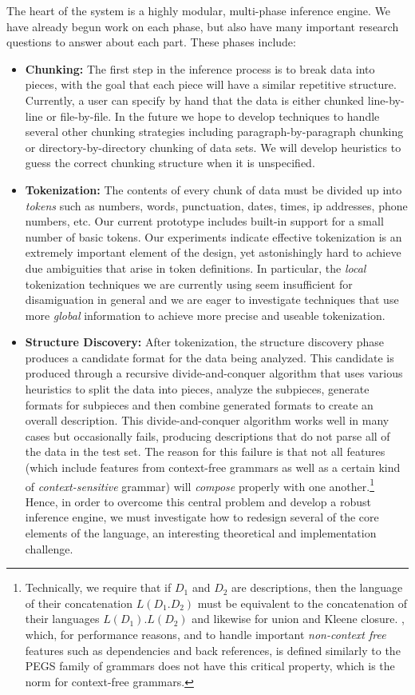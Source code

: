 The heart of the system is a highly modular, multi-phase inference 
engine.  We have already begun work on each phase, but also have
many important research questions to answer about each part.
These phases include:

\begin{itemize}
\item {\bf Chunking:}  The first step in the inference process
is to break data into pieces, with the goal that each piece will have
a similar repetitive structure.  Currently, a user can
specify by hand that the data is either chunked line-by-line or file-by-file.
In the future we hope to develop techniques to handle several other
chunking strategies including paragraph-by-paragraph chunking or
directory-by-directory chunking of data sets.  We will develop heuristics
to guess the correct chunking structure when it is unspecified.

\item {\bf Tokenization:}  
The contents of every chunk of data must be divided up
into {\em tokens} such as numbers, words, punctuation, dates, times, 
ip addresses, phone numbers, etc.  Our current prototype includes built-in
support for a small number of basic tokens.  Our experiments indicate
effective tokenization is an extremely important element of the design, yet
astonishingly hard to achieve due ambiguities that arise in token definitions.
In particular, the {\em local} tokenization techniques we are currently using
seem insufficient for disamiguation in general and we are eager to investigate 
techniques that use more {\em global} information to achieve more precise
and useable tokenization.

\item {\bf Structure Discovery:}
After tokenization, the structure discovery phase produces a
candidate format for the data being analyzed.  This candidate is
produced through a recursive divide-and-conquer algorithm that uses
various heuristics to split the data into pieces, analyze the subpieces,
generate formats for subpieces and then combine generated formats to
create an overall description.  This divide-and-conquer algorithm
works well in many cases but occasionally fails, producing \pads{} 
descriptions that do not parse all of the data in the test set.
The reason for this failure is that not all \pads{} features (which
include features from context-free grammars as well as a certain kind
of {\em context-sensitive} grammar) will 
{\em compose} properly with one another.\footnote{Technically, we require
that if $D_1$ and $D_2$ are \pads{} descriptions, then the language of their
concatenation $L(D_1 . D_2)$ must be equivalent to the concatenation
of their languages $L(D_1) . L(D_2)$ and likewise for union and Kleene
closure.  \pads{}, which, for performance reasons, and to handle important
{\em non-context free} features such as dependencies and back references, 
is defined similarly
to the PEGS family of grammars does not have this critical property, 
which is the norm for context-free grammars.}  Hence, in order to overcome
this central problem and develop a robust inference engine, we must
investigate how to redesign several of the core elements of 
the \pads{} language, an interesting theoretical and implementation
challenge.


\end{itemize}
